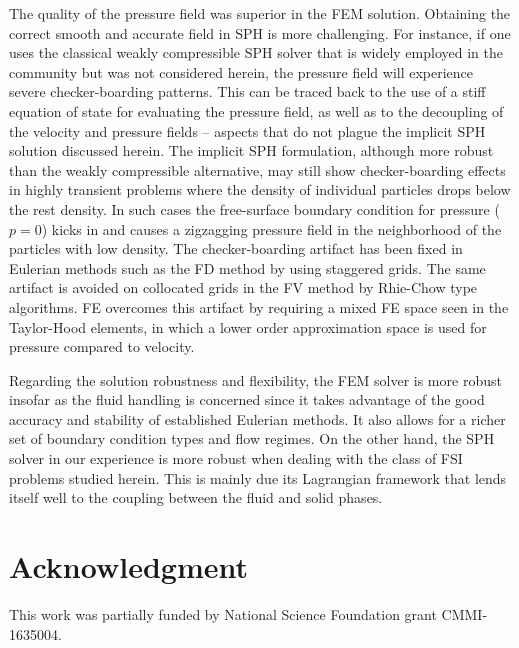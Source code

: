 \documentclass[final,3p,times]{elsarticle}
\begin{document}
The quality of the pressure field was superior in the FEM solution. Obtaining the correct smooth and accurate field in SPH is more challenging. For instance, if one uses the classical weakly compressible SPH solver that is widely employed in the community but was not considered herein, the pressure field will experience severe checker-boarding patterns. This can be traced back to the use of a stiff equation of state for evaluating the pressure field, as well as to the decoupling of the velocity and pressure fields -- aspects that do not plague the implicit SPH solution discussed herein. 
The implicit SPH formulation, although more robust than the weakly compressible alternative, may still show checker-boarding effects in highly transient problems where the density of individual particles drops below the rest density. In such cases the free-surface boundary condition for pressure ($p=0$) kicks in and causes a zigzagging pressure field in the neighborhood of the particles with low density. The checker-boarding artifact has been fixed in Eulerian methods such as the FD method by using staggered grids. The same artifact is avoided on collocated grids in the FV method by Rhie-Chow type algorithms. FE overcomes this artifact by requiring a mixed FE space seen in the Taylor-Hood elements, in which a lower order approximation space is used for pressure compared to velocity.  

Regarding the solution robustness and flexibility, the FEM solver is more robust insofar as the fluid handling is concerned since it takes advantage of the good accuracy and stability of established Eulerian methods. It also allows for a richer set of boundary condition types and flow regimes. On the other hand, the SPH solver in our experience is more robust when dealing with the class of FSI problems studied herein. This is mainly due its Lagrangian framework that lends itself well to the coupling between the fluid and solid phases. 

\section*{Acknowledgment}
This work was partially funded by National Science Foundation grant CMMI-1635004.




\end{document}
